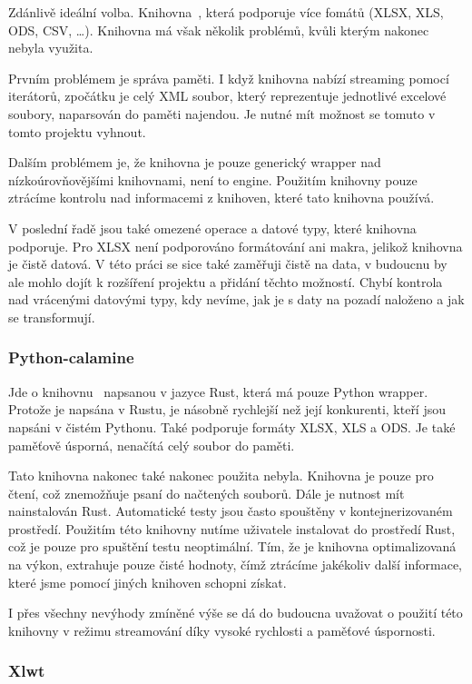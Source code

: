 Zdánlivě ideální volba. Knihovna~\cite{Pyexcel}, která podporuje více fomátů (XLSX, XLS, ODS, CSV, \dots). Knihovna má však několik problémů, kvůli kterým nakonec nebyla využita.

Prvním problémem je správa paměti. I když knihovna nabízí streaming pomocí iterátorů, zpočátku je celý XML soubor, který reprezentuje jednotlivé excelové soubory, naparsován do paměti najendou. Je nutné mít možnost se tomuto v tomto projektu vyhnout.

Dalším problémem je, že knihovna je pouze generický wrapper nad nízkoúrovňovějšími knihovnami, není to engine. Použitím knihovny pouze ztrácíme kontrolu nad informacemi z knihoven, které tato knihovna používá.

V poslední řadě jsou také omezené operace a datové typy, které knihovna podporuje. Pro XLSX není podporováno formátování ani makra, jelikož knihovna je čistě datová. V této práci se sice také zaměřuji čistě na data, v budoucnu by ale mohlo dojít k rozšíření projektu a přidání těchto možností. Chybí kontrola nad vrácenými datovými typy, kdy nevíme, jak je s daty na pozadí naloženo a jak se transformují.

\subsubsection{Python-calamine} 
\label{sec:calamine}

Jde o knihovnu~\cite{Python-calamine} napsanou v jazyce Rust, která má pouze Python wrapper. Protože je napsána v Rustu, je násobně rychlejší než její konkurenti, kteří jsou napsáni v čistém Pythonu. Také podporuje formáty XLSX, XLS a ODS. Je také paměťově úsporná, nenačítá celý soubor do paměti.

Tato knihovna nakonec také nakonec použita nebyla. Knihovna je pouze pro čtení, což znemožňuje psaní do načtených souborů. Dále je nutnost mít nainstalován Rust. Automatické testy jsou často spouštěny v kontejnerizovaném prostředí. Použitím této knihovny nutíme uživatele instalovat do prostředí Rust, což je pouze pro spuštění testu neoptimální. Tím, že je knihovna optimalizovaná na výkon, extrahuje pouze čisté hodnoty, čímž ztrácíme jakékoliv další informace, které jsme pomocí jiných knihoven schopni získat.

I přes všechny nevýhody zmíněné výše se dá do budoucna uvažovat o použití této knihovny v režimu streamování díky vysoké rychlosti a paměťové úspornosti.

\subsubsection{Xlwt}
\label{xlwt}

